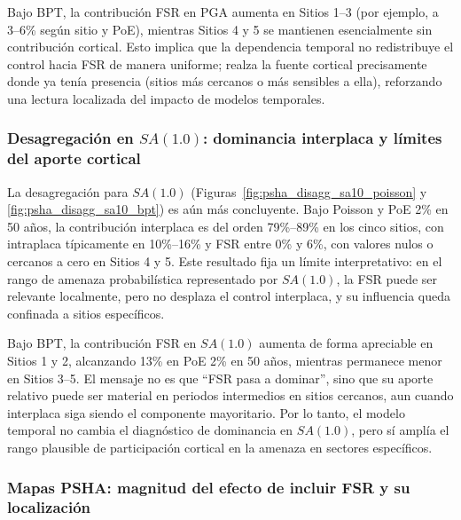 Bajo BPT, la contribución FSR en PGA aumenta en Sitios 1--3 (por ejemplo, a 3--6\% según sitio y PoE), mientras Sitios 4 y 5 se mantienen esencialmente sin contribución cortical. Esto implica que la dependencia temporal no redistribuye el control hacia FSR de manera uniforme; realza la fuente cortical precisamente donde ya tenía presencia (sitios más cercanos o más sensibles a ella), reforzando una lectura localizada del impacto de modelos temporales.

\subsubsection{\texorpdfstring{Desagregación en $SA(1.0)$: dominancia interplaca y límites del aporte cortical}{Desagregacion en SA(1.0): dominancia interplaca y limites del aporte cortical}}
\label{subsubsec:disc_psha_disagg_sa10}

La desagregación para $SA(1.0)$ (Figuras~\ref{fig:psha_disagg_sa10_poisson} y \ref{fig:psha_disagg_sa10_bpt}) es aún más concluyente. Bajo Poisson y PoE 2\% en 50 años, la contribución interplaca es del orden 79\%--89\% en los cinco sitios, con intraplaca típicamente en 10\%--16\% y FSR entre 0\% y 6\%, con valores nulos o cercanos a cero en Sitios 4 y 5. Este resultado fija un límite interpretativo: en el rango de amenaza probabilística representado por $SA(1.0)$, la FSR puede ser relevante localmente, pero no desplaza el control interplaca, y su influencia queda confinada a sitios específicos.

Bajo BPT, la contribución FSR en $SA(1.0)$ aumenta de forma apreciable en Sitios 1 y 2, alcanzando 13\% en PoE 2\% en 50 años, mientras permanece menor en Sitios 3--5. El mensaje no es que ``FSR pasa a dominar'', sino que su aporte relativo puede ser material en periodos intermedios en sitios cercanos, aun cuando interplaca siga siendo el componente mayoritario. Por lo tanto, el modelo temporal no cambia el diagnóstico de dominancia en $SA(1.0)$, pero sí amplía el rango plausible de participación cortical en la amenaza en sectores específicos.

\subsubsection{Mapas PSHA: magnitud del efecto de incluir FSR y su localización}
\label{subsubsec:disc_psha_mapas}

